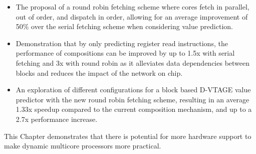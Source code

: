 \begin{itemize}
\item The proposal of a round robin fetching scheme where cores fetch in parallel, out of order, and dispatch in order, allowing for an average improvement of 50\% over the serial fetching scheme when considering value prediction.
\item Demonstration that by only predicting register read instructions, the performance of compositions can be improved by up to 1.5x with serial fetching and 3x with round robin as it alleviates data dependencies between blocks and reduces the impact of the network on chip.
\item An exploration of different configurations for a block based D-VTAGE value predictor with the new round robin fetching scheme, resulting in an average 1.33x speedup compared to the current composition mechanism, and up to a 2.7x performance increase.
\end{itemize}

This Chapter demonstrates that there is potential for more hardware support to make dynamic multicore processors more practical.
